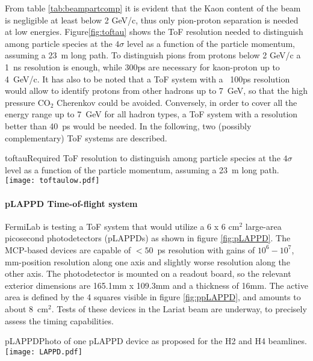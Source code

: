   From table \ref{tab:beampartcomp} it is evident that the Kaon content of the beam is negligible at least below 2 GeV/c, thus  only pion-proton separation is needed at low energies. Figure\ref{fig:toftau} shows the ToF resolution needed to distinguish among particle species at the $4\sigma$ level as a function of the particle momentum, assuming a 23~m long path. To distinguish pions from protons below 2 GeV/c a 1~ns resolution is enough, while 300ps are necessary for kaon-proton up to  4~GeV/c. It has also to be noted that a ToF system with a ~100ps resolution would allow to identify protons from other hadrons up to 7~GeV, so that the high pressure CO$_2$ Cherenkov could be avoided. Conversely, in order to cover all the energy range up to 7~GeV for all hadron  types, a ToF system with a resolution better than 40~ps would be needed.
In the following, two (possibly complementary) ToF systems are described.
\begin{cdrfigure}{toftau}{Required ToF resolution to  distinguish among particle species at the $4\sigma$ level as a function of the particle momentum, assuming a 23~m long path. }
\texttt{[image: toftaulow.pdf]}
\end{cdrfigure}

\paragraph{pLAPPD Time-of-flight system}
FermiLab is testing a ToF system that would utilize a 6 x 6 cm$^2$
large-area picosecond photodetectors (pLAPPDs) as shown in figure \ref{fig:pLAPPD}.
 The MCP-based devices
are capable of $< 50$~ps resolution with gains of $10^6-10^7$,
mm-position resolution along one axis and slightly worse resolution
along the other axis.  The photodetector is mounted on a readout
board, so the relevant exterior dimensions are 165.1mm x 109.3mm and a
thickness of 16mm. The active area is defined by the 4 squares visible in figure \ref{fig:ppLAPPD}, and amounts to about 8~cm$^2$. Tests of these devices in the Lariat beam are underway, to precisely assess the timing capabilities.
\begin{cdrfigure}[pLAPPD]{pLAPPD}{Photo of one pLAPPD device as proposed for the H2 and H4 beamlines.}
\texttt{[image: LAPPD.pdf]}
\end{cdrfigure}

